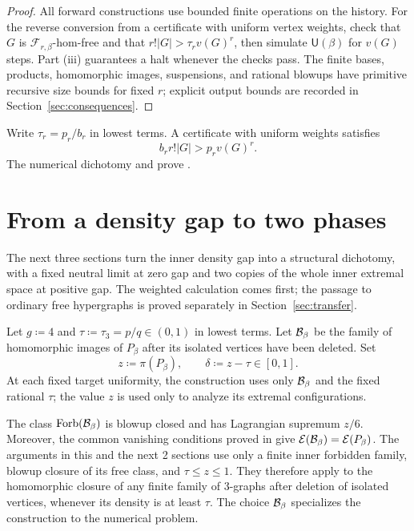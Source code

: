 \documentclass[10pt]{article}
\numberwithin{equation}{section}
\theoremstyle{definition}
\newcommand{\Forb}{\operatorname{Forb}}\newcommand{\Ext}{\operatorname{Ext}}
\begin{document}
\begin{proof}
All forward constructions use bounded finite operations on the history. For the reverse conversion from a certificate with uniform vertex weights, check that $G$ is $\mathcal F_{r,\beta}$-hom-free and that $r!|G|>\tau_r v(G)^r$, then simulate $\mathsf U(\beta)$ for $v(G)$ steps. Part \textup{(iii)} guarantees a halt whenever the checks pass. The finite bases, products, homomorphic images, suspensions, and rational blowups have primitive recursive size bounds for fixed $r$; explicit output bounds are recorded in Section~\ref{sec:consequences}.
\end{proof}

Write $\tau_r=p_r/b_r$ in lowest terms. A certificate with uniform weights satisfies
\begin{equation}\label{eq:balancedimprovement}
 b_rr!|G|>p_rv(G)^r.
\end{equation}
The numerical dichotomy and  prove .

\section{From a density gap to two phases}\label{sec:limits}
The next three sections turn the inner density gap into a structural dichotomy, with a fixed neutral limit at zero gap and two copies of the whole inner extremal space at positive gap. The weighted calculation comes first; the passage to ordinary free hypergraphs is proved separately in Section~\ref{sec:transfer}.

Let $g\coloneqq4$ and $\tau\coloneqq\tau_3=p/q\in(0,1)$ in lowest terms. Let $\mathcal B_\beta$ be the family of homomorphic images of $P_\beta$ after its isolated vertices have been deleted. Set
\[
 z\coloneqq\pi(P_\beta),\qquad \delta\coloneqq z-\tau\in[0,1].
\]
At each fixed target uniformity, the construction uses only $\mathcal B_\beta$ and the fixed rational $\tau$; the value $z$ is used only to analyze its extremal configurations.

The class $\Forb(\cB_\beta)$ is blowup closed and has Lagrangian supremum $z/6$. Moreover, the common vanishing conditions proved in  give $\mathcal E(\mathcal B_\beta)=\mathcal E(P_\beta)$. The arguments in this and the next 2 sections use only a finite inner forbidden family, blowup closure of its free class, and $\tau\le z\le1$. They therefore apply to the homomorphic closure of any finite family of $3$-graphs after deletion of isolated vertices, whenever its density is at least $\tau$. The choice $\mathcal B_\beta$ specializes the construction to the numerical problem.
\end{document}
